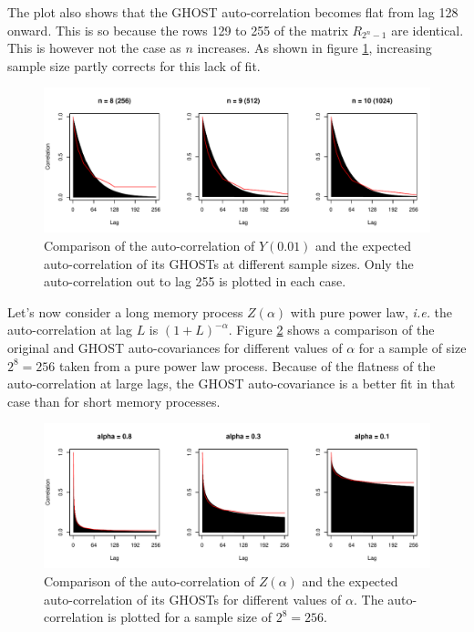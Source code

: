 \documentclass[12pt]{article}
\begin{document}
  The plot also shows that the GHOST auto-correlation becomes flat
  from lag 128 onward. This is so because the rows 129 to 255 of the
  matrix $R_{2^n-1}$ are identical. This is however not the case
  as $n$ increases. As shown in figure \ref{shortmem2}, increasing
  sample size partly corrects for this lack of fit.

  \begin{figure}[t] 
  \centering
  \includegraphics[scale=.7]{practical-short-mem-2_GF110907.pdf}
  \caption{Comparison of the auto-correlation of $Y(0.01)$ and the expected
  auto-correlation of its GHOSTs at different sample sizes.
  Only the auto-correlation out to lag 255 is plotted in each case.}
  \label{shortmem2}
  \end{figure}

  Let's now consider a long memory process $Z(\alpha)$ with pure power
  law, \textit{i.e.} the auto-correlation at lag $L$ is
  $(1+L)^{-\alpha}$. Figure
  \ref{longmem1} shows a comparison of the original and GHOST
  auto-covariances for different values of $\alpha$ for a sample
  of size $2^8=256$ taken from a pure power law process. Because
  of the flatness of the auto-correlation at large lags, the GHOST
  auto-covariance is a better fit in that case than for short
  memory processes.

  \begin{figure}[t] 
  \centering
  \includegraphics[scale=.7]{practical-long-mem-1_GF110907.pdf}
  \caption{Comparison of the auto-correlation of $Z(\alpha)$ and the
  expected auto-correlation of its GHOSTs for different values of
  $\alpha$. The auto-correlation is plotted for a sample size of
  $2^8=256$.}
  \label{longmem1}
  \end{figure}
\end{document}
